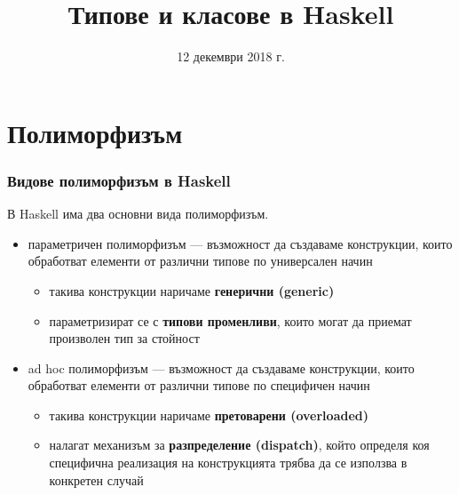 \documentclass[alsotrans]{beamerswitch}
\title{Типове и класове в Haskell}
\date{12 декември 2018 г.}
\begin{document}
\begin{frame}
  \titlepage
\end{frame}

\section{Полиморфизъм}

\begin{frame}
  \frametitle{Видове полиморфизъм в Haskell}

  В Haskell има два основни вида полиморфизъм.
  \begin{itemize}[<+->]
  \item \alert{параметричен полиморфизъм} --- възможност да създаваме конструкции, които обработват елементи от различни типове по \alert{универсален} начин
    \begin{itemize}
    \item такива конструкции наричаме \textbf{генерични (generic)}
    \item параметризират се  с \textbf{типови променливи}, които могат да приемат произволен тип за стойност
    \end{itemize}
  \item \alert{ad hoc полиморфизъм} --- възможност да създаваме конструкции, които обработват елементи от различни типове по \alert{специфичен} начин
    \begin{itemize}
    \item такива конструкции наричаме \textbf{претоварени (overloaded)}
    \item налагат механизъм за \textbf{разпределение (dispatch)}, който определя коя специфична реализация на конструкцията трябва да се използва в конкретен случай
    \end{itemize}
  \end{itemize}
\end{frame}
\end{document}
